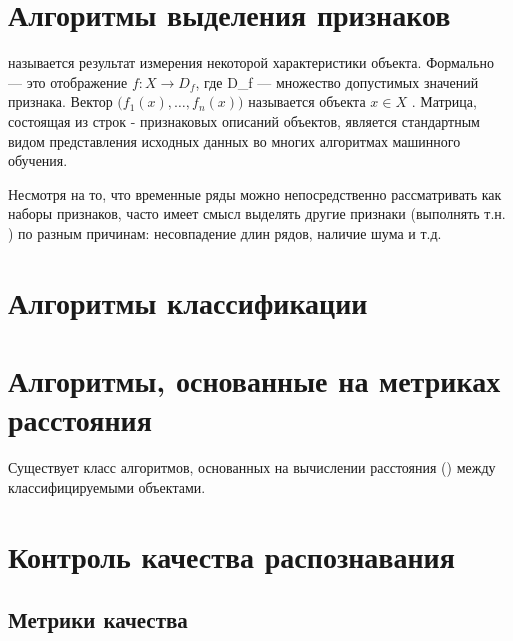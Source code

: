 \section{Алгоритмы выделения признаков}

 называется результат измерения некоторой характеристики объекта. Формально  — это отображение $f: X\to D_f $, где D\_f — множество допустимых значений признака. Вектор $\bigl( f_1(x),\ldots,f_n(x) \bigr)$ называется  объекта $x \in X$ \cite{features_def}. Матрица, состоящая из строк - признаковых описаний объектов, является стандартным видом представления исходных данных во многих алгоритмах машинного обучения. 

Несмотря на то, что временные ряды можно непосредственно рассматривать как наборы признаков, часто имеет смысл выделять другие признаки (выполнять т.н. ) по разным причинам: несовпадение длин рядов, наличие шума и т.д.







\section{Алгоритмы классификации}








\section{Алгоритмы, основанные на метриках расстояния}

Существует класс алгоритмов, основанных на вычислении расстояния () между классифицируемыми объектами. 






\section{Контроль качества распознавания}

\subsection{Метрики качества}


